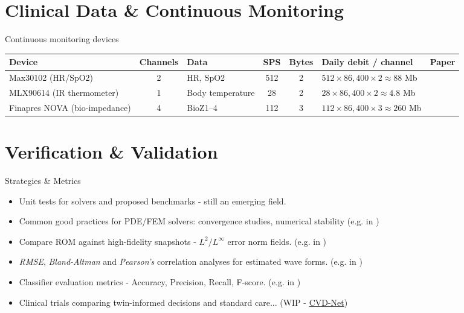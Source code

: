 \documentclass{beamer}
\begin{document}
\section{Clinical Data \& Continuous Monitoring}
\begin{frame}{Continuous monitoring devices}

  \scriptsize
  \begin{tabularx}{\textwidth}{|Y|c|Y|c|c|Y|c|}
  \hline
  \textbf{Device} & \textbf{Channels} & \textbf{Data} & \textbf{SPS} & \textbf{Bytes} & \textbf{Daily debit / channel} & \textbf{Paper} \\
  \hline
  Max30102 (HR/SpO2) 
  & 2 
  & HR, SpO2 
  & 512 
  & 2 
  & $512 \times 86{,}400 \times 2 \approx 88$ Mb 
  & \cite{jameil2025digital} \\
  \hline
  MLX90614 (IR thermometer) 
  & 1 
  & Body temperature 
  & 28 
  & 2 
  & $28 \times 86{,}400 \times 2 \approx 4.8$ Mb 
  & \cite{jameil2025digital} \\
  \hline
  Finapres NOVA (bio-impedance) 
  & 4 
  & BioZ1--4 
  & 112 
  & 3 
  & $112 \times 86{,}400 \times 3 \approx 260$ Mb 
  & \cite{jafari2022} \\
  \hline
  \end{tabularx}
  
\end{frame}

\section{Verification \& Validation}
\begin{frame}{Strategies \& Metrics}

    \begin{itemize}
        \item Unit tests for solvers and proposed benchmarks - still an emerging field. \textcite{Reidmen2025}
        \item Common good practices for PDE/FEM solvers: convergence studies, numerical stability (e.g. in \textcite{gerach2021electro})
        \item Compare ROM against high-fidelity snapshots - $L^2/L^\infty$ error norm fields. (e.g. in \textcite{Fresca2021})
        \item \textit{RMSE}, \textit{Bland-Altman} and \textit{Pearson’s} correlation analyses for estimated wave forms. (e.g. in \textcite{jafari2022})
        \item Classifier evaluation metrics - Accuracy, Precision, Recall, F-score. (e.g. in \textcite{burak2023})
        \item Clinical trials comparing twin-informed decisions and standard care... (WIP - \href{https://www.imperial.ac.uk/news/253154/digital-twin-heart-modelling-project-will/?utm_source}{CVD-Net})
    \end{itemize}
\end{frame}
\end{document}
